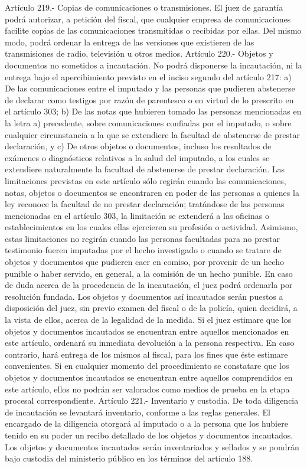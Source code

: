     Artículo 219.- Copias de comunicaciones o transmisiones. El juez de garantía podrá autorizar, a petición del fiscal, que cualquier empresa de comunicaciones facilite copias de las comunicaciones transmitidas o recibidas por ellas. Del mismo modo, podrá ordenar la entrega de las versiones que existieren de las transmisiones de radio, televisión u otros medios.
    Artículo 220.- Objetos y documentos no sometidos a incautación. No podrá disponerse la incautación, ni la entrega bajo el apercibimiento previsto en el inciso segundo del artículo 217:
    a) De las comunicaciones entre el imputado y las personas que pudieren abstenerse de declarar como testigos por razón de parentesco o en virtud de lo prescrito en el artículo 303;
    b) De las notas que hubieren tomado las personas mencionadas en la letra a) precedente, sobre comunicaciones confiadas por el imputado, o sobre cualquier circunstancia a la que se extendiere la facultad de abstenerse de prestar declaración, y c) De otros objetos o documentos, incluso los resultados de exámenes o diagnósticos relativos a la salud del imputado, a los cuales se extendiere naturalmente la facultad de abstenerse de prestar declaración.
    Las limitaciones previstas en este artículo sólo regirán cuando las comunicaciones, notas, objetos o documentos se encontraren en poder de las personas a quienes la ley reconoce la facultad de no prestar declaración; tratándose de las personas mencionadas en el artículo 303, la limitación se extenderá a las oficinas o establecimientos en los cuales ellas ejercieren su profesión o actividad.
    Asimismo, estas limitaciones no regirán cuando las personas facultadas para no prestar testimonio fueren imputadas por el hecho investigado o cuando se tratare de objetos y documentos que pudieren caer en comiso, por provenir de un hecho punible o haber servido, en general, a la comisión de un hecho punible.
    En caso de duda acerca de la procedencia de la incautación, el juez podrá ordenarla por resolución fundada. Los objetos y documentos así incautados serán puestos a disposición del juez, sin previo examen del fiscal o de la policía, quien decidirá, a la vista de ellos, acerca de la legalidad de la medida. Si el juez estimare que los objetos y documentos incautados se encuentran entre aquellos mencionados en este artículo, ordenará su inmediata devolución a la persona respectiva. En caso contrario, hará entrega de los mismos al fiscal, para los fines que éste estimare convenientes.
    Si en cualquier momento del procedimiento se constatare que los objetos y documentos incautados se encuentran entre aquellos comprendidos en este artículo, ellos no podrán ser valorados como medios de prueba en la etapa procesal correspondiente.
    Artículo 221.- Inventario y custodia. De toda diligencia de incautación se levantará inventario, conforme a las reglas generales. El encargado de la diligencia otorgará al imputado o a la persona que los hubiere tenido en su poder un recibo detallado de los objetos y documentos incautados.
    Los objetos y documentos incautados serán inventariados y sellados y se pondrán bajo custodia del ministerio público en los términos del artículo 188.

